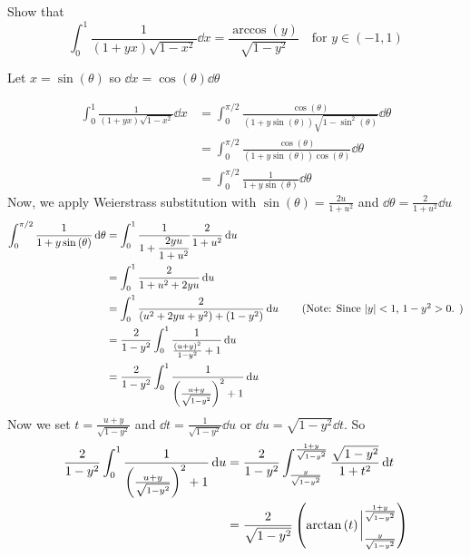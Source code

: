 \begin{exercise}
    Show that 
    \[ \int_{0 }^{1} \frac{1}{\left( 1+yx \right) \sqrt{1-x^{2}}} \dd{x} = \frac{ \arccos{ \left( y \right) }}{\sqrt{1-y^{2}}} \quad \text{for } y \in \left( -1,1 \right) \]
\end{exercise}
\begin{solution}
  Let \( x = \sin(\theta) \) so \( \dd{x} = \cos(\theta)\dd{\theta} \)

\begin{align*}
\int_{0}^{1} \frac{1}{(1+yx)\sqrt{1-x^{2}}}\dd{x}
&= \int_{0}^{\pi/2}
\frac{\cos(\theta)}
{\left(1 + y \sin(\theta)\right)\sqrt{1-\sin^{2}(\theta)}}
\dd{\theta} \\ 
&= \int_{0}^{\pi/2}
\frac{\cos(\theta)}
{\left(1 + y \sin(\theta)\right) \cos{ \left( \theta \right) }}
\dd{\theta} \\
&= \int_{0}^{\pi/2} \frac{1}{1+ y \sin{ \left( \theta \right) }} \dd{\theta}
\end{align*}
Now, we apply Weierstrass substitution with \( \sin{ \left( \theta \right) } = \frac{2u}{1+u^{2}} \) and \( \dd{\theta} = \frac{2}{1+u^{2}} \dd{u} \)
    \begin{align*}
        \int_{0}^{\pi/2} \frac{1}{1+ y \sin{ \left( \theta \right) }} \dd{\theta} &= \int_{0}^{1} \frac{1}{{\displaystyle 1 + \frac{2yu}{1+u^{2}}}} \frac{2}{1+u^{2}} \dd{u} \\ 
        &= \int_{0 }^{1} \frac{2}{1+u^{2}+2yu} \dd{u} \\
        &= \int_{0}^{1} \frac{2}{\left( u^{2} + 2yu +y^{2}\right) + \left( 1-y^{2} \right)} \dd{u} \tag{Note: Since $\abs{y} <1$, $1-y^{2} >0$. } \\
        &= \frac{2}{1-y^{2}} \displaystyle\int_{0}^{1} \frac{1}{\frac{\left( u +y\right)^{2}}{1-y^{2}} +1} \dd{u} \\
        &= \frac{2}{1-y^{2}} \int_{0}^{1} \frac{1}{ \left( \frac{u+y}{\sqrt{1-y^{2}}} \right)^{2} +1} \dd{u}
    \end{align*}
    Now we set \( t = \frac{u+y}{\sqrt{1-y^{2}}} \) and \( \dd{t}= \frac{1}{\sqrt{1-y^{2}}} \dd{u} \) or \( \dd{u} = \sqrt{1-y^{2}} \dd{t} \). 
    So 
    \begin{align*}
        \frac{2}{1-y^{2}} \int_{0}^{1} \frac{1}{ \left( \frac{u+y}{\sqrt{1-y^{2}}} \right)^{2} +1} \dd{u} &= \frac{2}{1-y^{2}}\int_{\frac{y}{\sqrt{1-y^{2}}}}^{\frac{1+y}{\sqrt{1-y^{2}}}} \frac{\sqrt{1-y^{2}}}{1+t^{2}} \dd{t} \\
        &= \frac{2}{\sqrt{1-y^{2}}} \left( \arctan{ \left( t \right) } \eval_{\frac{y}{\sqrt{1-y^{2}}}}^{\frac{1+y}{\sqrt{1-y^{2}}}} \right) \\

\end{align*}
\end{solution}
